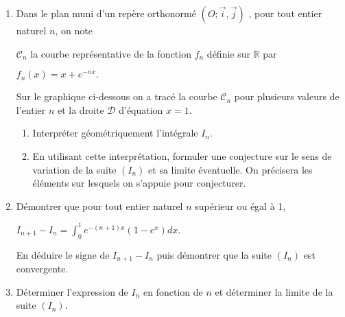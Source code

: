 \begin{enumerate}
     \item
     Dans le plan muni d'un repère orthonormé $\left(O; \vec{i}, \vec{j}\right)$ , pour tout entier naturel $n$, on note
     \par
     $\mathscr C_{n}$ la courbe représentative de la fonction $f_{n} $ définie sur $\mathbb{R}$ par
     \begin{center}$f_{n}\left(x\right)=x+e^{-nx}. $\end{center}
     Sur le graphique ci-dessous on a tracé la courbe  $\mathscr C_{n}$ pour plusieurs valeurs de l'entier $n$ et la droite $\mathscr D$ d'équation $x=1$.

\begin{center}
\end{center}

     \begin{enumerate}[label=\alph*.]
          \item
          Interpréter géométriquement l'intégrale $I_{n}$.
          \item
     En utilisant cette interprétation, formuler une conjecture sur le sens de   variation de la suite $\left(I_{n}\right)$ et sa limite éventuelle. On précisera les éléments sur lesquels on s'appuie pour conjecturer.\end{enumerate}
     \item
     Démontrer que pour tout entier naturel $n$ supérieur ou égal à 1,
     \begin{center}$I_{n+1}-I_{n}=\int_{0}^{1}e^{-\left(n+1\right)x} \left(1-e^{x}\right)dx.$\end{center}
     En déduire le signe de $I_{n+1}-I_{n}$ puis démontrer que la suite $\left(I_{n}\right)$ est convergente.
     \item
     Déterminer l'expression de $I_{n}$ en fonction de $n$ et déterminer la limite de la suite $\left(I_{n}\right)$.
\end{enumerate}
